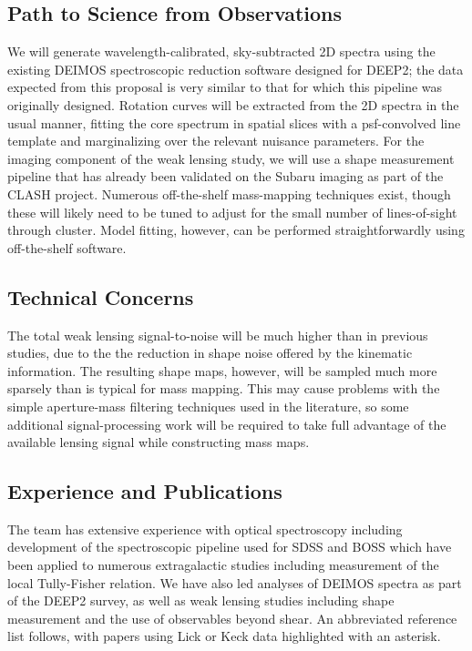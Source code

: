 \documentclass[12pt]{article}
\begin{document}
\subsection{Path to Science from Observations}
We will generate wavelength-calibrated, sky-subtracted 2D spectra using the existing DEIMOS spectroscopic reduction software designed for DEEP2; the data expected from this proposal is very similar to that for which this pipeline was originally designed. Rotation curves will be extracted from the 2D spectra in the usual manner, fitting the core spectrum in spatial slices with a psf-convolved line template and marginalizing over the relevant nuisance parameters. For the imaging component of the weak lensing study, we will use a shape measurement pipeline that has already been validated on the Subaru imaging as part of the CLASH project. Numerous off-the-shelf mass-mapping techniques exist, though these will likely need to be tuned to adjust for the small number of lines-of-sight through cluster. Model fitting, however, can be performed straightforwardly using off-the-shelf software.

\subsection{Technical Concerns}
The total weak lensing signal-to-noise will be much higher than in previous studies, due to the the reduction in shape noise offered by the kinematic information. The resulting shape maps, however, will be sampled much more sparsely than is typical for mass mapping. This may cause problems with the simple aperture-mass filtering techniques used in the literature, so some additional signal-processing work will be required to take full advantage of the available lensing signal while constructing mass maps.

\subsection{Experience and Publications}
The team has extensive experience with optical spectroscopy including development of the spectroscopic pipeline used for SDSS and BOSS which have been applied to numerous extragalactic studies including measurement of the local Tully-Fisher relation. We have also led analyses of DEIMOS spectra as part of the DEEP2 survey, as well as weak lensing studies including shape measurement and the use of observables beyond shear. An abbreviated reference list follows, with papers using Lick or Keck data highlighted with an asterisk.
\end{document}
